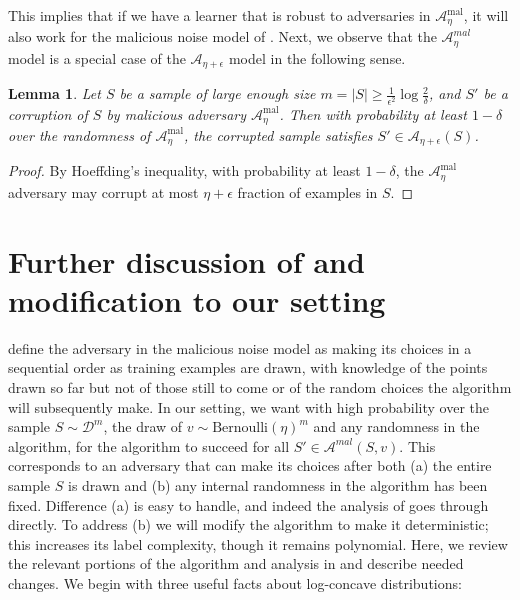 \documentclass[11pt]{article}
\newtheorem{lemma}[theorem]{Lemma}
\newcommand{\0}{\mathbf{0}}
\newcommand{\1}{\mathbf{1}}
\newcommand{\cA}{\mathcal{A}}
\newcommand{\cD}{\mathcal{D}}
\begin{document}
This implies that if we have a learner that is robust to adversaries in $\cA_\eta^{\text{mal}}$, it will also work for the malicious noise model of \cite{kearns1993learning}.
Next, we observe that the $\cA_\eta^{mal}$ model is a special case of the $\cA_{\eta+\epsilon}$ model in the following sense.

\begin{lemma}
Let $S$ be a sample of large enough size $m=|S|\ge \frac{1}{\epsilon^2}\log\frac{2}{\delta}$, and $S'$ be a corruption of $S$ by malicious adversary $\cA^{\text{mal}}_\eta$. Then with probability at least $1-\delta$ over the randomness of $\cA^{\text{mal}}_\eta$, the corrupted sample satisfies $S'\in\cA_{\eta+\epsilon}(S)$.
\end{lemma}

\begin{proof}
By Hoeffding's inequality, with probability at least $1-\delta$, the $\cA^{\text{mal}}_\eta$ adversary may corrupt at most $\eta+\epsilon$ fraction of examples in $S$.
\end{proof}



\section{Further discussion of  \cite{awasthi2017power} and modification to our setting}
\label{appendix:ABL}
\cite{awasthi2017power} define the adversary in the malicious noise model as making its choices in a sequential order as training examples are drawn, with knowledge of the points drawn so far but not of those still to come or of the random choices the algorithm will subsequently make.  In our setting, we want with high probability over the sample $S \sim \cD^m$, the draw of $v \sim \mbox{Bernoulli}(\eta)^m$ and any randomness in the algorithm, for the algorithm to succeed for all $S' \in \cA^{mal}(S,v)$.  This corresponds to an adversary that can make its choices after both (a) the entire sample $S$ is drawn and (b) any internal randomness in the algorithm has been fixed. Difference (a) is easy to handle, and indeed the analysis of \cite{awasthi2017power} goes through directly. To address (b) we will modify the algorithm to make it deterministic; this increases its label complexity, though it remains polynomial.    Here, we review the relevant portions of the algorithm and analysis in \cite{awasthi2017power} and describe needed changes.
We begin with three useful facts about log-concave distributions:
\end{document}
